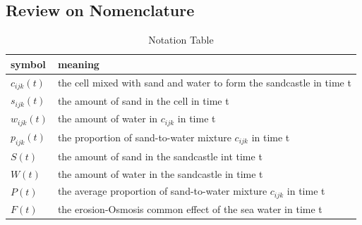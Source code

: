 \documentclass[12pt]{article}
\begin{document}
\subsection{Review on Nomenclature}
\begin{table}[H]
    \caption{Notation Table}
    \vspace{10pt}
    \centering
    \begin{tabular}{ |l| p{5cm}| }
        \hline
        symbol       & meaning                                                             \\
        \hline
        $c_{ijk}(t)$ & the cell mixed with sand and water to form the sandcastle in time t \\
        $s_{ijk}(t)$ & the amount of sand in the cell in time t                            \\
        $w_{ijk}(t)$ & the amount of water in  $c_{ijk}$ in time t                         \\
        $p_{ijk}(t)$ & the proportion of sand-to-water mixture $c_{ijk}$ in time t         \\
        $S(t)$       & the amount of sand in the sandcastle	int time t                      \\
        $W(t)$       & the amount of water in the sandcastle in time t                     \\
        $P(t)$       & the average proportion of sand-to-water mixture $c_{ijk}$ in time t \\
        $F(t)$       & the erosion-Osmosis common effect of the sea water in time t        \\
        \hline
    \end{tabular}
    \label{bs1}
\end{table}
\end{document}
